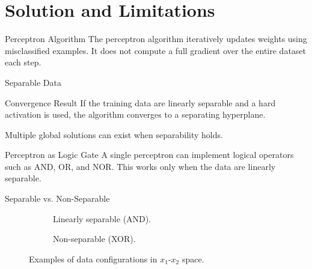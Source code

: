 \documentclass[10pt]{beamer}
\begin{document}
\section{Solution and Limitations}

\begin{frame}{Perceptron Algorithm}
  \justifying
  The perceptron algorithm iteratively updates weights using misclassified examples.
  It does not compute a full gradient over the entire dataset each step.
\end{frame}

\begin{frame}{Separable Data}
  \justifying
  \begin{conceptbox}{Convergence Result}
    If the training data are linearly separable and a hard activation is used, the algorithm converges to a separating hyperplane.
  \end{conceptbox}
  Multiple global solutions can exist when separability holds.
\end{frame}

\begin{frame}{Perceptron as Logic Gate}
  \justifying
  A single perceptron can implement logical operators such as AND, OR, and NOR.
  This works only when the data are linearly separable.
\end{frame}

\begin{frame}{Separable vs. Non-Separable}
  \justifying
  \begin{figure}[ht]
    \centering
    \begin{subfigure}[b]{0.45\textwidth}
      \centering
      \caption{Linearly separable (AND).}
    \end{subfigure}
    \hfill
    \begin{subfigure}[b]{0.45\textwidth}
      \centering
      \caption{Non-separable (XOR).}
    \end{subfigure}
    \caption{Examples of data configurations in $x_1$-$x_2$ space.}
  \end{figure}
\end{frame}
\end{document}
